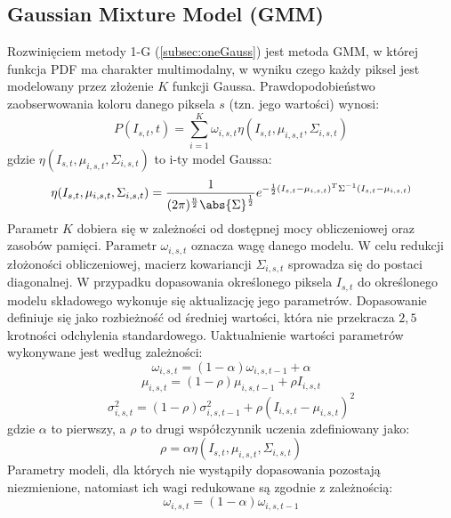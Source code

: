 \subsection{Gaussian Mixture Model (GMM)}
\label{subsec:GaussianMM}
Rozwinięciem metody 1-G (\ref{subsec:oneGauss}) jest metoda GMM, w której funkcja PDF ma charakter multimodalny, w wyniku czego każdy piksel jest modelowany przez złożenie $K$ funkcji Gaussa. Prawdopodobieństwo zaobserwowania koloru danego piksela $s$ (tzn. jego wartości) wynosi:
\begin{equation}
	P(I_{s,t},t) = \sum_{i=1}^{K}\omega_{i,s,t}\eta(I_{s,t},\mu_{i,s,t},\Sigma_{i,s,t})
\end{equation}
gdzie $\eta(I_{s,t},\mu_{i,s,t},\Sigma_{i,s,t})$ to i-ty model Gaussa:
\begin{equation}
	\eta(I_{s,t},\mu_{i,s,t},\Sigma_{i,s,t}) = \frac{1}{(2\pi)^\frac{n}{2}\abs{\Sigma}^{\frac{1}{2}}}e^{-\frac{1}{2}(I_{s,t}-\mu_{i,s,t})^T\Sigma^{-1}(I_{s,t}-\mu_{i,s,t})}
\end{equation}
Parametr $K$ dobiera się w zależności od dostępnej mocy obliczeniowej oraz zasobów pamięci. Parametr $\omega_{i,s,t}$ oznacza wagę danego modelu. W celu redukcji złożoności obliczeniowej, macierz kowariancji $\Sigma_{i,s,t}$ sprowadza się do postaci diagonalnej. W przypadku dopasowania określonego piksela $I_{s,t}$ do określonego modelu składowego  wykonuje się aktualizację jego parametrów. Dopasowanie definiuje się jako rozbieżność od średniej wartości, która nie przekracza $2,5$ krotności odchylenia standardowego. Uaktualnienie wartości parametrów wykonywane jest według zależności:
\begin{equation}
	\omega_{i,s,t} = (1-\alpha)\omega_{i,s,t-1}+\alpha
\end{equation}
\begin{equation}
	\mu_{i,s,t} = (1-\rho)\mu_{i,s,t-1}+\rho I_{i,s,t}
\end{equation}
\begin{equation}
	\sigma_{i,s,t}^2 = (1-\rho)\sigma_{i,s,t-1}^2+\rho(I_{i,s,t} - \mu_{i,s,t})^2
\end{equation}
gdzie $\alpha$ to pierwszy, a $\rho$ to drugi współczynnik uczenia zdefiniowany jako:
\begin{equation}
	\rho = \alpha \eta(I_{s,t},\mu_{i,s,t},\Sigma_{i,s,t})
\end{equation}
Parametry modeli, dla których nie wystąpiły dopasowania pozostają niezmienione, natomiast ich wagi redukowane są zgodnie z zależnością:
\begin{equation}
	\omega_{i,s,t} = (1 - \alpha)\omega_{i,s,t-1}
\end{equation} 
